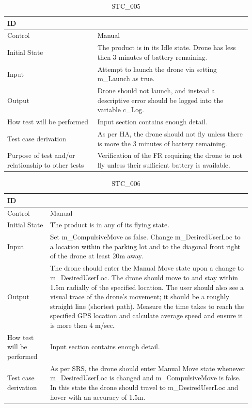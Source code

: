 \documentclass[12pt, titlepage]{article}
\begin{document}
\begin{enumerate}
\begin{table}[!h]
\begin{center}
\caption {STC\_005}
\label{tab:STC_005}
\begin{tabular}{ | m{3.2cm} | m{12.2cm} | } 
\hline
ID & \nameref{tab:STC_005} \\ 
\hline
Control & Manual \\ 
\hline
Initial State & The product is in its Idle state. Drone has less then 3 minutes of battery remaining.  \\ 
\hline
Input & Attempt to launch the drone via setting m\_Launch as true. \\ 
\hline
Output & Drone should not launch, and instead a descriptive error should be logged into the variable c\_Log.  \\ 
\hline
How test will be performed & Input section contains enough detail. \\ 
\hline
Test case derivation & As per HA, the drone should not fly unless there is more the 3 minutes of battery remaining.
 \\ 
\hline
Purpose of test and/or relationship to other tests & Verification of the FR requiring the drone to not fly unless their sufficient battery is available. 
\\ 
\hline
\end{tabular}
\end{center}
\end{table}

\begin{table}[!h]
\begin{center}
\caption {STC\_006}
\label{tab:STC_006}
\begin{tabular}{ | m{3.2cm} | m{12.2cm} | } 
\hline
ID & \nameref{tab:STC_006} \\ 
\hline
Control & Manual \\ 
\hline
Initial State & The product is in any of its flying state.   \\ 
\hline
Input & Set m\_CompulsiveMove as false. Change m\_DesiredUserLoc to a location within the parking lot and to the diagonal front right of the drone at least 20m away.  \\ 
\hline
Output & The drone should enter the Manual Move state upon a change to m\_DesiredUserLoc. The drone should move to and stay within 1.5m radially of the specified location. 
The user should also see a visual trace of the drone's movement; it should be a roughly straight line (shortest path).
Measure the time takes to reach the specified GPS location and calculate average speed and ensure it is more then 4 m/sec.  \\ 
\hline
How test will be performed & Input section contains enough detail. \\ 
\hline
Test case derivation & As per SRS, the drone should enter Manual Move state whenever m\_DesiredUserLoc is changed and m\_CompulsiveMove is false. In this state the drone should travel to m\_DesiredUserLoc and hover with an accuracy of 1.5m. 


\end{tabular}
\end{center}
\end{table}
\end{enumerate}
\end{document}
